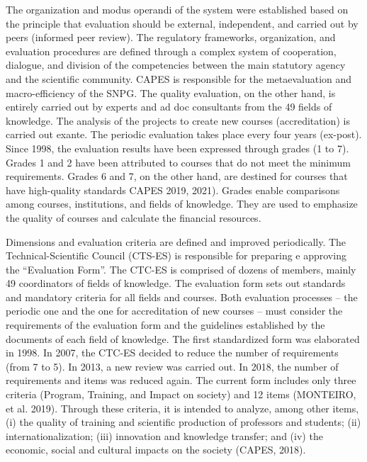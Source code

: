 

The organization and modus operandi of the system were established based on the principle that evaluation should be external, independent, and carried out by peers (informed peer review). The regulatory frameworks, organization, and evaluation procedures are defined through a complex system of cooperation, dialogue, and division of the competencies between the main statutory agency and the scientific community. CAPES is responsible for the metaevaluation and macro-efficiency of the SNPG. The quality evaluation, on the other hand, is entirely carried out by experts and ad doc consultants from the 49 fields of knowledge. The analysis of the projects to create new courses (accreditation) is carried out exante. The periodic evaluation takes place every four years (ex-post). Since 1998, the evaluation results have been expressed through grades (1 to 7). Grades 1 and 2 have been attributed to courses that do not meet the minimum requirements. Grades 6 and 7, on the other hand, are destined for courses that have high-quality standards CAPES 2019, 2021). Grades enable comparisons among courses, institutions, and fields of knowledge. They are used to emphasize the quality of courses and calculate the financial resources. 

Dimensions and evaluation criteria are defined and improved periodically. The Technical-Scientific Council (CTS-ES) is responsible for preparing e approving the “Evaluation Form”. The CTC-ES is comprised of dozens of members, mainly 49 coordinators of fields of knowledge. The evaluation form sets out standards and mandatory criteria for all fields and courses. Both evaluation processes – the periodic one and the one for accreditation of new courses – must consider the requirements of the evaluation form and the guidelines established by the documents of each field of knowledge. The first standardized form was elaborated in 1998. In 2007, the CTC-ES decided to reduce the number of requirements (from 7 to 5). In 2013, a new review was carried out. In 2018, the number of requirements and items was reduced again. The current form includes only three criteria (Program, Training, and Impact on society) and 12 items (MONTEIRO, et al. 2019). Through these criteria, it is intended to analyze, among other items, (i) the quality of training and scientific production of professors and students; (ii) internationalization; (iii) innovation and knowledge transfer; and (iv) the economic, social and cultural impacts on the society (CAPES, 2018). 


